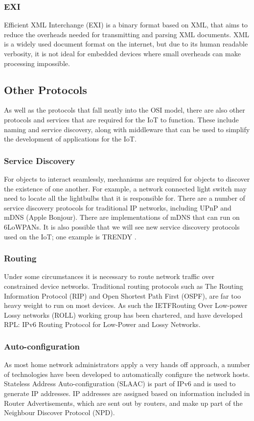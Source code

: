 \documentclass[10pt,journal,compsoc]{IEEEtran}
\begin{document}
\subsubsection{EXI}
Efficient XML Interchange (EXI) is a binary format based on XML, that aims to
reduce the overheads needed for transmitting and parsing XML documents. XML is
a widely used document format on the internet, but due to its human readable
verbosity, it is not ideal for embedded devices where small overheads can make
processing impossible. 

\subsection{Other Protocols}
As well as the protocols that fall neatly into the OSI model, there are also
other protocols and services that are required for the IoT to function. These
include naming and service discovery, along with middleware that can be used to
simplify the development of applications for the IoT.

\subsubsection{Service Discovery}
For objects to interact seamlessly, mechanisms are required for objects to
discover the existence of one another. For example, a network connected light
switch may need to locate all the lightbulbs that it is responsible for. There
are a number of service discovery protocols for traditional IP networks,
including UPnP and mDNS (Apple Bonjour). There are implementations of mDNS
that can run on 6LoWPANs. It is also possible that we will see new service
discovery protocols used on the IoT; one example is TRENDY \cite{Butt2013}. 

\subsubsection{Routing}
Under some circumstances it is necessary to route network traffic over
constrained device networks. Traditional routing protocols such as The Routing
Information Protocol (RIP) and Open Shortest Path First (OSPF), are far too
heavy weight to run on most devices. As such the IETFRouting Over Low-power
Lossy networks (ROLL) working group has been chartered, and have developed RPL:
IPv6 Routing Protocol for Low-Power and Lossy Networks.  

\subsubsection{Auto-configuration}
As most home network administrators apply a very hands off approach, a number
of technologies have been developed to automatically configure the network
hosts. Stateless Address Auto-configuration (SLAAC) is part of IPv6 and is used
to generate IP addresses. IP addresses are assigned based on information
included in Router Advertisements, which are sent out by routers, and make up
part of the Neighbour Discover Protocol (NPD). 
\end{document}
